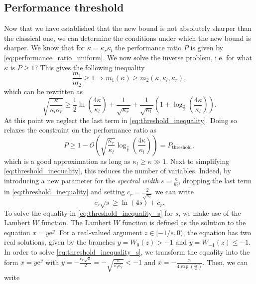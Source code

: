 \subsection{Performance threshold}\label{sec:performance_threshold}
Now that we have established that the new bound is not absolutely sharper than the classical one, we can determine the conditions under which the new bound is sharper. We know that for $\kappa=\kappa_r\kappa_l$ the performance ratio $P$ is given by \cref{eq:performance_ratio_uniform}. We now solve the inverse problem, i.e. for what $\kappa$ is $P \geq 1$? This gives the following inequality
\[
    \frac{m_1}{m_2} \geq 1 \Rightarrow m_1(\kappa) \geq m_2(\kappa, \kappa_l, \kappa_r),
\]
which can be rewritten as
\begin{equation}
    \sqrt{\frac{\kappa}{\kappa_l\kappa_r}} \geq \frac{1}{2}\ln\left(\frac{4\kappa}{\kappa_l}\right) + \frac{1}{\sqrt{\kappa_r}} + \frac{1}{\sqrt{\kappa_l}}\left(1 + \log_{\frac{2}{\epsilon}}\left(\frac{4\kappa}{\kappa_l}\right)\right).
    \label{eq:threshold_inequality}
\end{equation}
At this point we neglect the last term in \cref{eq:threshold_inequality}. Doing so relaxes the constraint on the performance ratio as
\begin{equation}
    P \geq 1 - \mathcal{O}\left(\sqrt{\frac{\kappa_r}{\kappa_l}}\log_{\frac{2}{\epsilon}}\left(\frac{4\kappa}{\kappa_l}\right)\right) = P_{\text{threshold}},
    \label{eq:approximate_performance_ratio_threshold}
\end{equation}
which is a good approximation as long as $\kappa_l \geq \kappa \gg 1$. Next to simplifying \cref{eq:threshold_inequality}, this reduces the number of variables. Indeed, by introducing a new parameter for the \textit{spectral width} $s = \frac{\kappa}{\kappa_l}$, dropping the last term in \cref{eq:threshold_inequality} and setting $c_r = \frac{2}{\sqrt{\kappa_r}}$ we can write
\begin{equation}
    c_r\sqrt{s} \geq \ln\left(4s\right) + c_r.
    \label{eq:threshold_inequality_s}
\end{equation}
To solve the equality in \cref{eq:threshold_inequality_s} for $s$, we make use of the Lambert $W$ function. The Lambert $W$ function is defined as the solution to the equation $x = y\mathrm{e}^y$. For a real-valued argument $z \in [-1/e, 0)$, the equation has two real solutions, given by the branches $y = W_0(z) > -1$ and $y = W_{-1}(z) \leq -1$. In order to solve \cref{eq:threshold_inequality_s}, we transform the equality into the form $x = y \mathrm{e}^y$ with $y = -\frac{c_r\sqrt{s}}{2} = -\sqrt{\frac{\kappa}{\kappa_l\kappa_r}} < -1$ and $x = -\frac{c_r}{4\exp\left(\frac{c_r}{2}\right)}$. Then, we can write
